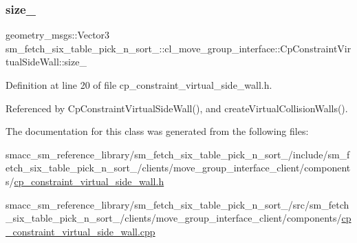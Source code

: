 \subsubsection{\texorpdfstring{size\+\_\+}{size\_}}
{\footnotesize\ttfamily geometry\+\_\+msgs\+::\+Vector3 sm\+\_\+fetch\+\_\+six\+\_\+table\+\_\+pick\+\_\+n\+\_\+sort\+\_\+::cl\+\_\+move\+\_\+group\+\_\+interface\+::\+Cp\+Constraint\+Virtual\+Side\+Wall\+::size\+\_\+\hspace{0.3cm}{\ttfamily [private]}}



Definition at line 20 of file cp\+\_\+constraint\+\_\+virtual\+\_\+side\+\_\+wall.\+h.



Referenced by Cp\+Constraint\+Virtual\+Side\+Wall(), and create\+Virtual\+Collision\+Walls().



The documentation for this class was generated from the following files\+:\begin{DoxyCompactItemize}
\item 
smacc\+\_\+sm\+\_\+reference\+\_\+library/sm\+\_\+fetch\+\_\+six\+\_\+table\+\_\+pick\+\_\+n\+\_\+sort\+\_/include/sm\+\_\+fetch\+\_\+six\+\_\+table\+\_\+pick\+\_\+n\+\_\+sort\+\_/clients/move\+\_\+group\+\_\+interface\+\_\+client/components/\hyperlink{sm__fetch__six__table__pick__n__sort__1_2include_2sm__fetch__six__table__pick__n__sort__1_2clien7f93e7455babc7d676e39efb9e19e82b}{cp\+\_\+constraint\+\_\+virtual\+\_\+side\+\_\+wall.\+h}\item 
smacc\+\_\+sm\+\_\+reference\+\_\+library/sm\+\_\+fetch\+\_\+six\+\_\+table\+\_\+pick\+\_\+n\+\_\+sort\+\_/src/sm\+\_\+fetch\+\_\+six\+\_\+table\+\_\+pick\+\_\+n\+\_\+sort\+\_/clients/move\+\_\+group\+\_\+interface\+\_\+client/components/\hyperlink{sm__fetch__six__table__pick__n__sort__1_2src_2sm__fetch__six__table__pick__n__sort__1_2clients_2674f5136ecf4d5f27de0ff918bdcc52c}{cp\+\_\+constraint\+\_\+virtual\+\_\+side\+\_\+wall.\+cpp}\end{DoxyCompactItemize}
